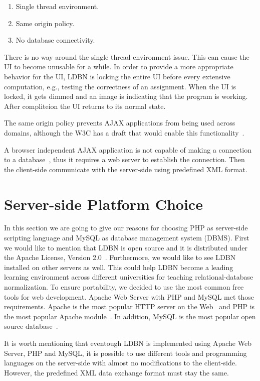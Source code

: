 \begin{enumerate}
	\item Single thread environment.
	\item Same origin policy.
	\item No database connectivity.
\end{enumerate}

There is no way around the single thread environment issue. This can cause the UI
to become unusable for a while. In order to provide a more appropriate behavior 
for the UI, LDBN is locking the entire UI before every extensive computation, e.g.,
testing the correctness of an assignment. When the UI is locked,
it gets dimmed and an image is indicating that the program is working. After 
compliteion the UI returns to its normal state. 

The same origin policy prevents AJAX applications from being used across domains,
although the W3C has a draft that would enable this functionality~\cite{bajax1}.

A browser independent AJAX application is not capable of making a connection 
to a database~\cite{bajax1}, thus it requires a web server to establish the 
connection. Then the client-side communicate with the server-side using 
predefined XML format.

\section{Server-side Platform Choice}
In this section we are going to give our reasons for choosing PHP as server-side
scripting language and MySQL as database management system (DBMS). First we would
like to mention that LDBN is open source and it is distributed under the 
Apache License, Version 2.0~\cite{walv2}. Furthermore, we would like to see 
LDBN installed on other servers as well. This could help LDBN become
a leading learning environment across 
different universities for teaching relational-database normalization. To ensure 
portability, we decided to use the most common free 
tools for web development. Apache Web Server with PHP and MySQL met those requirements. 
Apache is the most popular HTTP server on the Web~\cite{w3} and PHP is the most popular 
Apache module~\cite{w4}. In addition, MySQL is the most popular open source 
database~\cite{w5}.
 
It is worth mentioning that eventough LDBN is implemented using Apache Web Server,
PHP and MySQL, it is possible to use different tools and programming languages 
on the server-side with almost no modifications to the client-side. However, 
the predefined XML data exchange format must stay the same.


